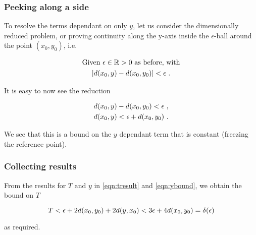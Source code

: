 \begin{frame}
    \frametitle{Peeking along a side}

    To resolve the terms dependant on only \(y\), let us consider
    the dimensionally reduced problem, or proving continuity along the y-axis
    inside the \(\epsilon\)-ball around the point \((x_0, y_0)\), i.e.

    \begin{gather*}
        \text{Given } \epsilon \in \mathbb{R} > 0 \text{ as before, with} \\
        |d(x_0, y) - d(x_0, y_0)| < \epsilon~.
    \end{gather*}

    \pause

    It is easy to now see the reduction

    \begin{gather}
        d(x_0, y) - d(x_0, y_0) < \epsilon~, \nonumber \\
        d(x_0, y) < \epsilon + d(x_0, y_0)~.
        \label{eqn:ybound}
    \end{gather}

    We see that this is a bound on the \(y\) dependant term that is constant
    (freezing the reference point).

\end{frame}

\begin{frame}
    \frametitle{Collecting results}

    From the results for \(T \text{ and } y\) in \autoref{eqn:tresult} and
    \autoref{eqn:ybound}, we obtain the bound on \(T\)

    \begin{equation}
        T < \epsilon + 2d(x_0, y_0) + 2d(y, x_0) < 3\epsilon + 4d(x_0, y_0) = \delta(\epsilon)
    \end{equation}

    as required.

\end{frame}

